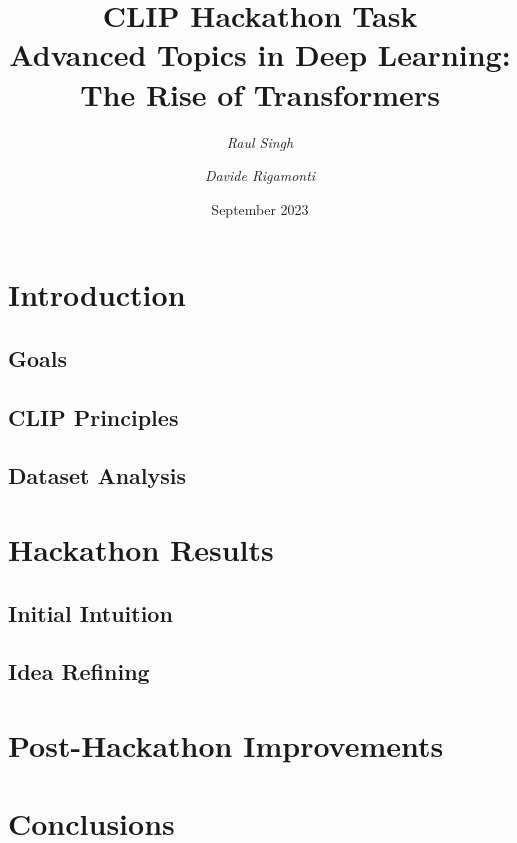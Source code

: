 \documentclass[12pt, a4paper]{article}
\title{\huge\bfseries CLIP Hackathon Task \\ \normalsize\bfseries Advanced Topics in Deep Learning: The Rise of Transformers}
\date{September 2023}
\author{\textit{Raul Singh} \and \textit{Davide Rigamonti}}
\begin{document}
\maketitle

\tableofcontents

\section{Introduction}
\blindtext[1]
\subsection{Goals}
\blindtext[1]
\subsection{CLIP Principles}
\blindtext[1]
\subsection{Dataset Analysis}
\blindtext[1]

\section{Hackathon Results}
\blindtext[1]
\subsection{Initial Intuition}
\blindtext[1]
\subsection{Idea Refining}
\blindtext[1]

\section{Post-Hackathon Improvements}
\blindtext[1]

\section{Conclusions}
\blindtext[1]
\end{document}
